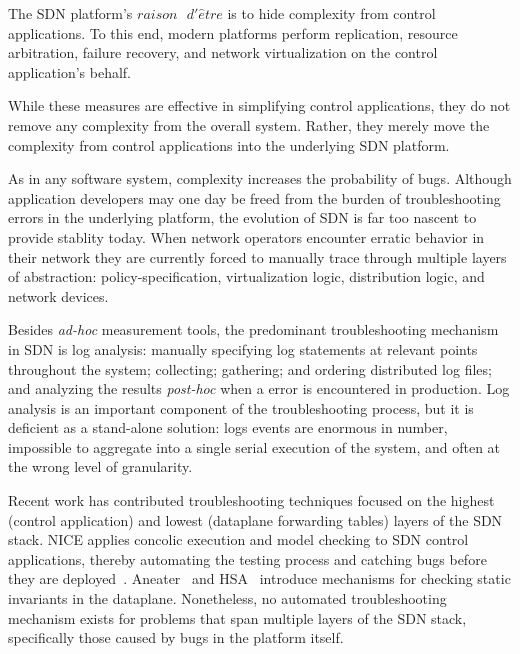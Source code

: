 The SDN platform's $raison\text{ }d'\hat{e}tre$ is to 
hide complexity from control applications. To this end, modern platforms perform
replication, resource arbitration, failure recovery, and network 
virtualization on the control application's behalf. 

While these measures are effective in simplifying control applications,
they do not remove any complexity from the overall system. Rather, they merely move the complexity
from control applications into the underlying SDN platform. 

As in any software system, complexity increases the probability of
bugs. Although application developers may one day be freed from the burden
of troubleshooting errors in the underlying platform, the evolution of SDN
is far too nascent to provide stablity today. When 
network operators encounter erratic behavior in their network
they are currently forced to manually trace through
multiple layers of abstraction: policy-specification, virtualization logic, distribution logic, and
network devices.

Besides {\it ad-hoc} measurement tools,
the predominant troubleshooting mechanism in SDN is
log analysis: manually specifying log statements at relevant points throughout the system;
collecting; gathering; and ordering distributed log files; and analyzing the
results {\it post-hoc} when a error is encountered in production. Log analysis
is an important component of the troubleshooting process, but it is deficient
as a stand-alone solution: logs events
are enormous in number, impossible to aggregate into a single serial
execution of the system, and often at the wrong level of granularity.

Recent work has contributed troubleshooting techniques focused on the highest (control
application) and lowest (dataplane forwarding tables) layers of the SDN stack.
NICE applies concolic execution and model checking to SDN control
applications, thereby automating the testing process and catching bugs before
they are deployed~\cite{nice}. Aneater~\cite{anteater} and HSA~\cite{hsa}
introduce mechanisms for checking static invariants in the dataplane.
Nonetheless, no automated troubleshooting mechanism exists for problems that span
multiple layers of the SDN stack, specifically those caused by bugs in the platform
itself.


